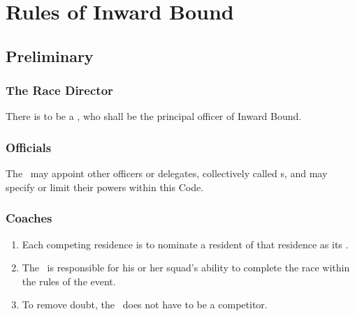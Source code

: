 \documentclass[12pt]{report}
\begin{document}
  \maketitle\setcounter{page}{2}
  \normalsize
  \tableofcontents
  \part{Rules of Inward Bound}
  \chapter{Preliminary}
  \section{The {Race Director}}
  \begin{fenumerate}\item
  There is to be a , who shall be the principal officer of  Inward Bound.
  \end{fenumerate}
  \section{Officials}
  \begin{fenumerate}\item
  The \RaceDirector\ may appoint other officers or delegates, collectively called s, and may specify or limit their powers within this Code.
  \end{fenumerate}
  \section{Coaches}
  \begin{enumerate}
    \item Each competing residence is to nominate a resident of that residence as its .
    \item The \Captain\ is responsible for his or her squad's ability to complete the race within the rules of the event.
    \item To remove doubt, the \Captain\ does not have to be a competitor.\label{enum:CaptainNonCompetitor}

  \end{enumerate}
\end{document}
